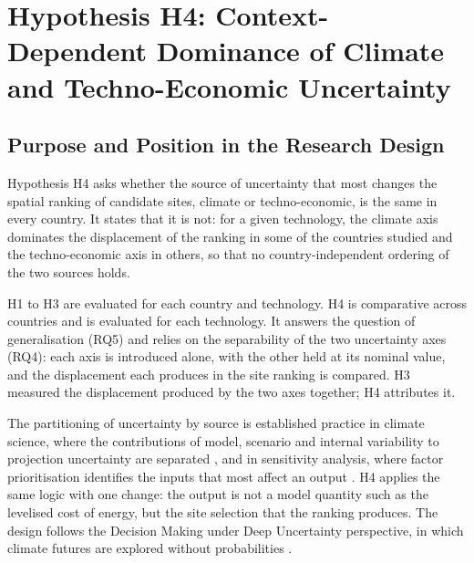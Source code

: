 
\section{Hypothesis H4: Context-Dependent Dominance of Climate and
Techno-Economic Uncertainty}
\label{sec:h4}

\subsection{Purpose and Position in the Research Design}
\label{subsec:h4_purpose}

Hypothesis H4 asks whether the source of uncertainty that most changes the
spatial ranking of candidate sites, climate or techno-economic, is the same in
every country. It states that it is not: for a given technology, the climate
axis dominates the displacement of the ranking in some of the countries studied
and the techno-economic axis in others, so that no country-independent ordering
of the two sources holds.

H1 to H3 are evaluated for each country and technology. H4 is comparative across
countries and is evaluated for each technology. It answers the question of
generalisation (RQ5) and relies on the separability of the two uncertainty axes
(RQ4): each axis is introduced alone, with the other held at its nominal value,
and the displacement each produces in the site ranking is compared. H3 measured
the displacement produced by the two axes together; H4 attributes it.

The partitioning of uncertainty by source is established practice in climate
science, where the contributions of model, scenario and internal variability to
projection uncertainty are separated \cite{hawkinssutton2009}, and in
sensitivity analysis, where factor prioritisation identifies the inputs that
most affect an output \cite{saltelli2008,pianosi2016}. H4 applies the same
logic with one change: the output is not a model quantity such as the
levelised cost of energy, but the site selection that the ranking produces. The
design follows the Decision Making under Deep Uncertainty perspective, in which
climate futures are explored without probabilities
\cite{lempert2003,marchau2019}.

